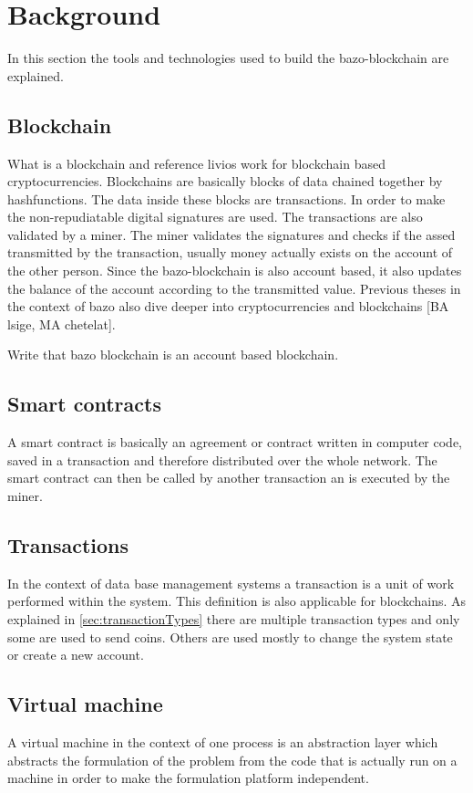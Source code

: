 \section{Background}
In this section the tools and technologies used to build the bazo-blockchain are explained.

\subsection{Blockchain}
What is a blockchain and reference livios work for blockchain based cryptocurrencies. Blockchains are basically blocks of data chained together by hashfunctions. The data inside these blocks are transactions. In order to make the non-repudiatable digital signatures are used. The transactions are also validated by a miner. The miner validates the signatures and checks if the assed transmitted by the transaction, usually money actually exists on the account of the other person. Since the bazo-blockchain is also account based, it also updates the balance of the account according to the transmitted value. Previous theses in the context of bazo also dive deeper into cryptocurrencies and blockchains [BA lsige, MA chetelat].

Write that bazo blockchain is an account based blockchain.

\subsection{Smart contracts}
A smart contract is basically an agreement or contract written in computer code, saved in a transaction and therefore distributed over the whole network. The smart contract can then be called by another transaction an is executed by the miner. 

\subsection{Transactions}
In the context of data base management systems a transaction is a unit of work performed within the system. \cite{dbtransaction} This definition is also applicable for blockchains. As explained in \autoref{sec:transactionTypes}
there are multiple transaction types and only some are used to send coins. Others are used mostly to change the system state or create a new account.

\subsection{Virtual machine}
A virtual machine in the context of one process is an abstraction layer which abstracts the formulation of the problem from the code that is actually run on a machine in order to make the formulation platform independent.